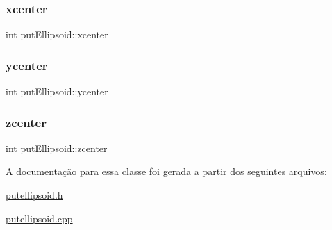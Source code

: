 \subsubsection{\texorpdfstring{xcenter}{xcenter}}
{\footnotesize\ttfamily int put\+Ellipsoid\+::xcenter\hspace{0.3cm}{\ttfamily [protected]}}

\mbox{\label{classput_ellipsoid_adb01d95e70b45ce240ce16d76ebcfb71}} 
\subsubsection{\texorpdfstring{ycenter}{ycenter}}
{\footnotesize\ttfamily int put\+Ellipsoid\+::ycenter\hspace{0.3cm}{\ttfamily [protected]}}

\mbox{\label{classput_ellipsoid_a54a37ce969af959213d510b1d438c388}} 
\subsubsection{\texorpdfstring{zcenter}{zcenter}}
{\footnotesize\ttfamily int put\+Ellipsoid\+::zcenter\hspace{0.3cm}{\ttfamily [protected]}}



A documentação para essa classe foi gerada a partir dos seguintes arquivos\+:\begin{DoxyCompactItemize}
\item 
\mbox{\hyperlink{putellipsoid_8h}{putellipsoid.\+h}}\item 
\mbox{\hyperlink{putellipsoid_8cpp}{putellipsoid.\+cpp}}\end{DoxyCompactItemize}

